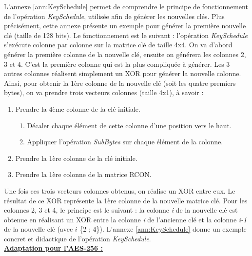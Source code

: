 \documentclass[oneside]{book}
\begin{document}
\hspace{-0.5cm}L'annexe \ref{ann:KeySchedule} permet de comprendre le principe de fonctionnement de l'opération \textit{KeySchedule}, utilisée afin de générer les nouvelles clés. Plus précisément, cette annexe présente un exemple pour générer la première nouvelle clé (taille de 128 bits). Le fonctionnement est le suivant : l'opération \textit{KeySchedule} s'exécute colonne par colonne sur la matrice clé de taille 4x4. On va d'abord générer la première colonne de la nouvelle clé, ensuite on générera les colonnes 2, 3 et 4. C'est la première colonne qui est la plus compliquée à générer. Les 3 autres colonnes réalisent simplement un XOR pour générer la nouvelle colonne.
Ainsi, pour obtenir la 1ère colonne de la nouvelle clé (soit les quatre premiers bytes), on va prendre trois vecteurs colonnes (taille 4x1), à savoir : 
\begin{enumerate}
\item Prendre la 4ème colonne de la clé initiale.
\begin{enumerate}
\item Décaler chaque élément de cette colonne d'une position vers le haut.
\item Appliquer l'opération \textit{SubBytes} sur chaque élément de la colonne.
\end{enumerate}
\item Prendre la 1ère colonne de la clé initiale.
\item Prendre la 1ère colonne de la matrice RCON.
\end{enumerate}
Une fois ces trois vecteurs colonnes obtenus, on réalise un XOR entre eux. Le résultat de ce XOR représente la 1ère colonne de la nouvelle matrice clé. Pour les colonnes 2, 3 et 4, le principe est le suivant : la colonne \textit{i} de la nouvelle clé est obtenue en réalisant un XOR entre la colonne \textit{i} de l'ancienne clé et la colonne \textit{i-1} de la nouvelle clé (avec $i$ {\epsilon} \{2 ; 4\}). L'annexe \ref{ann:KeySchedule} donne un exemple concret et didactique de l'opération \textit{KeySchedule}. \\

\underline{\textbf{Adaptation pour l'AES-256 :}} 
\end{document}
